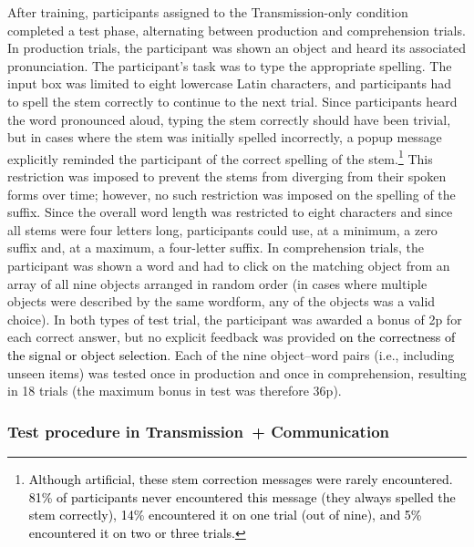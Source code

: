 \documentclass[doc,biblatex]{apa7}
\newcommand\newmaterial[1]{\textcolor{black}{#1}}
\begin{document}
After training, participants assigned to the Transmission-only condition completed a test phase, alternating between production and comprehension trials. In production trials, the participant was shown an object and heard its associated pronunciation. The participant's task was to type the appropriate spelling. The input box was limited to eight lowercase Latin characters, and participants had to spell the stem correctly to continue to the next trial. Since participants heard the word pronounced aloud, typing the stem correctly should have been trivial, but in cases where the stem was initially spelled incorrectly, a popup message explicitly reminded the participant of the correct spelling of the stem.\footnote{\newmaterial{Although artificial, these stem correction messages were rarely encountered. 81\% of participants never encountered this message (they always spelled the stem correctly), 14\% encountered it on one trial (out of nine), and 5\% encountered it on two or three trials.}} This restriction was imposed to prevent the stems from diverging from their spoken forms over time; however, no such restriction was imposed on the spelling of the suffix. Since the overall word length was restricted to eight characters and since all stems were four letters long, participants could use, at a minimum, a zero suffix and, at a maximum, a four-letter suffix. In comprehension trials, the participant was shown a word and had to click on the matching object from an array of all nine objects arranged in random order (in cases where multiple objects were described by the same wordform, any of the objects was a valid choice). In both types of test trial, the participant was awarded a bonus of 2p for each correct answer, but no explicit feedback was provided \newmaterial{on the correctness of the signal or object selection}. Each of the nine object--word pairs (i.e., including unseen items) was tested once in production and once in comprehension, resulting in 18 trials (the maximum bonus in test was therefore 36p).

\subsubsection{Test procedure in Transmission~+ Communication}
\end{document}
